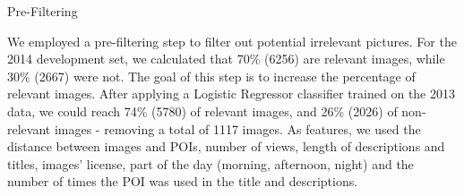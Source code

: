 

\begin{subsection}{Pre-Filtering}

We employed a pre-filtering step to filter out potential irrelevant pictures.
For the 2014 development set, we calculated that 70\% (6256) are relevant images, while 30\% (2667) were not.
The goal of this step is to increase the percentage of relevant images. 
After applying a Logistic Regressor classifier trained on the 2013 data, we could reach 74\% (5780) of relevant images, and 26\% (2026) of non-relevant images - removing a total of 1117 images. As features, we used the distance between images and POIs, number of views, length of descriptions and titles, images' license, part of the day (morning, afternoon, night) and the number of times the POI was used in the title and descriptions.



\end{subsection}



